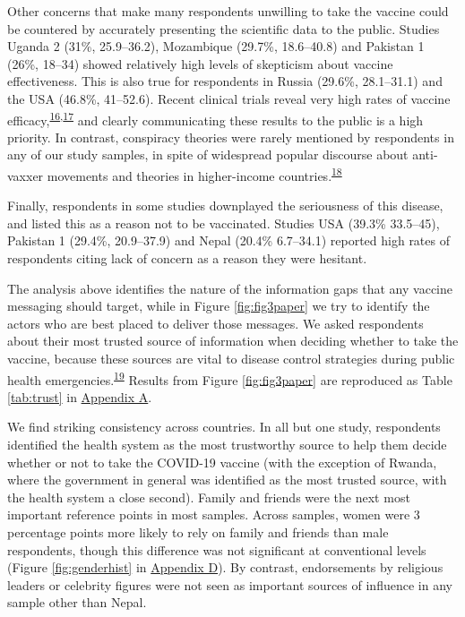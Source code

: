 \documentclass[
  12pt,
]{article}
\begin{document}
Other concerns that make many respondents unwilling to take the vaccine could be countered by accurately presenting the scientific data to the public. Studies Uganda 2 (31\%, 25.9--36.2), Mozambique (29.7\%, 18.6--40.8) and Pakistan 1 (26\%, 18--34) showed relatively high levels of skepticism about vaccine effectiveness. This is also true for respondents in Russia (29.6\%, 28.1--31.1) and the USA (46.8\%, 41--52.6). Recent clinical trials reveal very high rates of vaccine efficacy,\textsuperscript{\protect\hyperlink{ref-baden2021efficacy}{16},\protect\hyperlink{ref-polack2020safety}{17}} and clearly communicating these results to the public is a high priority. In contrast, conspiracy theories were rarely mentioned by respondents in any of our study samples, in spite of widespread popular discourse about anti-vaxxer movements and theories in higher-income countries.\textsuperscript{\protect\hyperlink{ref-loomba_measuring_2021}{18}}

Finally, respondents in some studies downplayed the seriousness of this disease, and listed this as a reason not to be vaccinated. Studies USA (39.3\% 33.5--45), Pakistan 1 (29.4\%, 20.9--37.9) and Nepal (20.4\% 6.7--34.1) reported high rates of respondents citing lack of concern as a reason they were hesitant.

The analysis above identifies the nature of the information gaps that any vaccine messaging should target, while in Figure \ref{fig:fig3paper} we try to identify the actors who are best placed to deliver those messages. We asked respondents about their most trusted source of information when deciding whether to take the vaccine, because these sources are vital to disease control strategies during public health emergencies.\textsuperscript{\protect\hyperlink{ref-siegrist2014role}{19}} Results from Figure \ref{fig:fig3paper} are reproduced as Table \ref{tab:trust} in \protect\hyperlink{appendixd}{Appendix A}.

We find striking consistency across countries. In all but one study, respondents identified the health system as the most trustworthy source to help them decide whether or not to take the COVID-19 vaccine (with the exception of Rwanda, where the government in general was identified as the most trusted source, with the health system a close second). Family and friends were the next most important reference points in most samples. Across samples, women were 3 percentage points more likely to rely on family and friends than male respondents, though this difference was not significant at conventional levels (Figure \ref{fig:genderhist} in \protect\hyperlink{appendixd}{Appendix D}). By contrast, endorsements by religious leaders or celebrity figures were not seen as important sources of influence in any sample other than Nepal.
\end{document}
